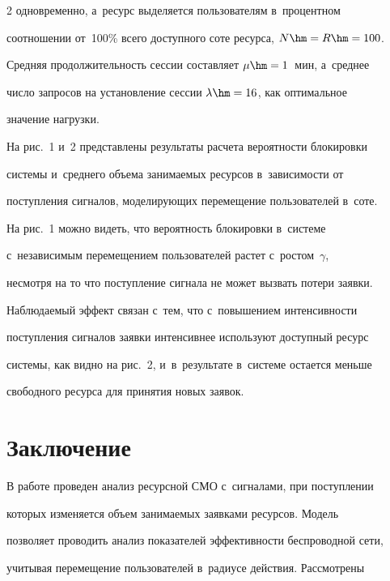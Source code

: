 \begin{multicols}{2}
одновременно, а~ресурс выделяется пользователям в~процентном 

соотношении от~100\% всего доступного соте ресурса, $N\hm=R\hm=100$. 

Средняя продолжительность сессии составляет $\mu\hm=1$~мин, а~среднее 

число запросов на установление сессии $\lambda\hm=16$, как оптимальное 

значение нагрузки. 

  

  На рис.~1 и~2 представлены результаты расчета вероятности блокировки 

системы и~среднего объема занимаемых ресурсов в~зависимости от 

поступления сигналов, моделирующих перемещение пользователей в~соте. 

  





  На рис.~1 можно видеть, что вероятность блокировки в~системе 

с~независимым перемещением пользователей растет с~ростом~$\gamma$, 

несмотря на то что поступление сигнала не может вызвать потери заявки. 

Наблюдаемый эффект связан с~тем, что с~повышением интенсивности 

поступления сигналов заявки интенсивнее используют доступный ресурс 

системы, как видно на рис.~2, и~в~результате в~системе остается меньше 

свободного ресурса для принятия новых заявок.



\vspace*{-9pt}



  \section{Заключение}

  

  В работе проведен анализ ресурсной СМО с~сигналами, при поступлении 

которых изменяется объем занимаемых заявками ресурсов. Модель 

позволяет проводить анализ показателей эффективности беспроводной сети, 

учитывая перемещение пользователей в~радиусе действия. Рассмотрены 


\end{multicols}

